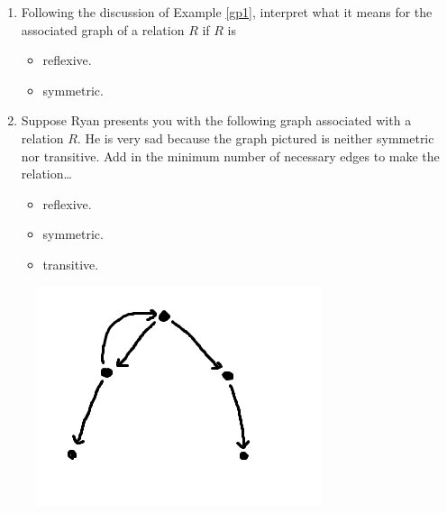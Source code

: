 \begin{enumerate}
	\item Following the discussion of Example \ref{gp1}, interpret what it means for the associated graph of a relation $R$ if $R$ is 
	\begin{itemize}
		\item reflexive.
		\item symmetric.
	\end{itemize}
	\item Suppose Ryan presents you with the following graph associated with a relation $R$. He is very sad because the graph pictured is neither symmetric nor transitive. Add in the minimum number of necessary edges to make the relation\ldots
	\begin{itemize}
		\item reflexive.
		\item symmetric.
		\item transitive.
	\end{itemize}
\end{enumerate}
\begin{figure}[ht]
	\centering
	\includegraphics{Ch3/rgraph_ex1.png}
\end{figure}